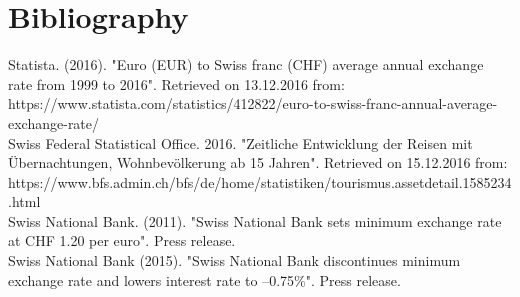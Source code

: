 \documentclass[12pt,a4paper,bibliography=totocnumbered,listof=totocnumbered]{scrartcl}
\begin{document}



%


%






\newpage



\section{Bibliography}

Statista. (2016). "Euro (EUR) to Swiss franc (CHF) average annual exchange rate from 1999 to 2016". Retrieved on 13.12.2016 from: \\https://www.statista.com/statistics/412822/euro-to-swiss-franc-annual-average-exchange-rate/
\ \\

Swiss Federal Statistical Office. 2016. "Zeitliche Entwicklung der Reisen mit Übernachtungen, Wohnbevölkerung ab 15 Jahren". Retrieved on 15.12.2016 from: \\https://www.bfs.admin.ch/bfs/de/home/statistiken/tourismus.assetdetail.1585234.html
\ \\

Swiss National Bank. (2011). "Swiss National Bank sets minimum exchange rate at CHF 1.20 per euro". Press release.
\ \\

Swiss National Bank (2015). "Swiss National Bank discontinues minimum exchange rate and lowers interest rate to –0.75\%". Press release. 
\newpage
\end{document}

